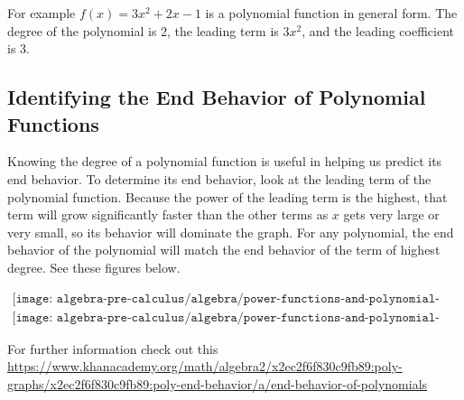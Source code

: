 For example $f(x)=3x^2+2x-1$ is a polynomial function in general form. The degree of the polynomial is 2, the leading term is $3x^2$, and the leading coefficient is 3.

\subsection{Identifying the End Behavior of Polynomial Functions}

Knowing the degree of a polynomial function is useful in helping us predict its end behavior. To determine its end
behavior, look at the leading term of the polynomial function. Because the power of the leading term is the highest, that
term will grow significantly faster than the other terms as $x$ gets very large or very small, so its behavior will dominate
the graph. For any polynomial, the end behavior of the polynomial will match the end behavior of the term of highest
degree. See these figures below.

\begin{align*}
    \texttt{[image: algebra-pre-calculus/algebra/power-functions-and-polynomial-functions/pol\_table1.png]}\\
    \texttt{[image: algebra-pre-calculus/algebra/power-functions-and-polynomial-functions/pol\_table2.png]}
\end{align*} \break

For further information check out this \url{https://www.khanacademy.org/math/algebra2/x2ec2f6f830c9fb89:poly-graphs/x2ec2f6f830c9fb89:poly-end-behavior/a/end-behavior-of-polynomials}


